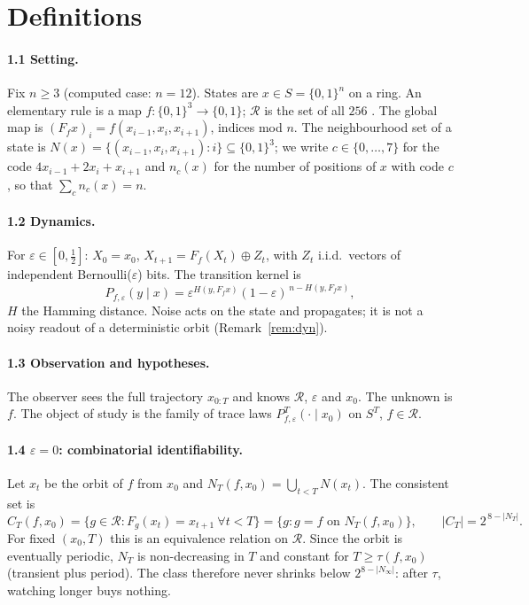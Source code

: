\documentclass[11pt,a4paper]{article}
\theoremstyle{remark}
\newcommand{\eps}{\varepsilon}
\newcommand{\R}{\mathcal{R}}
\begin{document}
\section{Definitions}

\paragraph{1.1 Setting.}
Fix $n\ge3$ (computed case: $n=12$). States are $x\in S=\{0,1\}^n$ on a ring. An elementary rule is a map $f:\{0,1\}^3\to\{0,1\}$; $\R$ is the set of all $256$ \citep{Wolfram1983}. The global map is $(F_f x)_i=f(x_{i-1},x_i,x_{i+1})$, indices mod $n$. The neighbourhood set of a state is $N(x)=\{(x_{i-1},x_i,x_{i+1}):i\}\subseteq\{0,1\}^3$; we write $c\in\{0,\dots,7\}$ for the code $4x_{i-1}+2x_i+x_{i+1}$ and $n_c(x)$ for the number of positions of $x$ with code $c$, so that $\sum_c n_c(x)=n$.

\paragraph{1.2 Dynamics.}
For $\eps\in[0,\tfrac12]$: $X_0=x_0$, $X_{t+1}=F_f(X_t)\oplus Z_t$, with $Z_t$ i.i.d.\ vectors of independent Bernoulli($\eps$) bits. The transition kernel is
\[
P_{f,\eps}(y\mid x)=\eps^{H(y,F_f x)}(1-\eps)^{\,n-H(y,F_f x)},
\]
$H$ the Hamming distance. Noise acts on the state and propagates; it is not a noisy readout of a deterministic orbit (Remark~\ref{rem:dyn}).

\paragraph{1.3 Observation and hypotheses.}
The observer sees the full trajectory $x_{0:T}$ and knows $\R$, $\eps$ and $x_0$. The unknown is $f$. The object of study is the family of trace laws $P^T_{f,\eps}(\cdot\mid x_0)$ on $S^T$, $f\in\R$.

\paragraph{1.4 $\eps=0$: combinatorial identifiability.}
Let $x_t$ be the orbit of $f$ from $x_0$ and $N_T(f,x_0)=\bigcup_{t<T}N(x_t)$. The consistent set is
\[
C_T(f,x_0)=\{g\in\R:F_g(x_t)=x_{t+1}\ \forall t<T\}=\{g:g=f\text{ on }N_T(f,x_0)\},\qquad |C_T|=2^{\,8-|N_T|}.
\]
For fixed $(x_0,T)$ this is an equivalence relation on $\R$. Since the orbit is eventually periodic, $N_T$ is non-decreasing in $T$ and constant for $T\ge\tau(f,x_0)$ (transient plus period). The class therefore never shrinks below $2^{8-|N_\infty|}$: after $\tau$, watching longer buys nothing.
\end{document}
